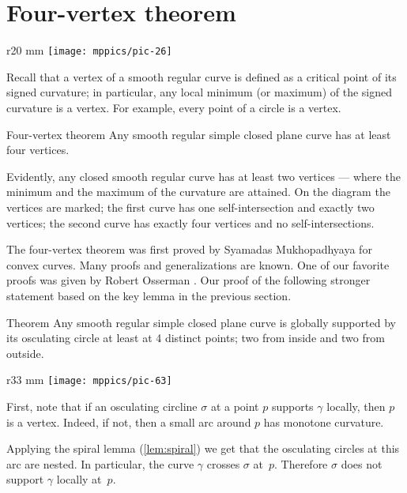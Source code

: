 \section{Four-vertex theorem}
{

\begin{wrapfigure}{r}{20 mm}
\vskip-8mm
\centering
\texttt{[image: mppics/pic-26]}
\vskip0mm
\end{wrapfigure}

Recall that a vertex of a smooth regular curve is defined as a critical point of its signed curvature;
in particular, any local minimum (or maximum) of the signed curvature is a vertex.
For example, every point of a circle is a vertex.

\begin{thm}{Four-vertex theorem}\label{thm:4-vert}
Any smooth regular simple closed plane curve has at least four vertices.
\end{thm}

}

Evidently, any closed smooth regular curve has at least two vertices --- where the minimum and the maximum of the curvature are attained.
On the diagram the vertices are marked;
the first curve has one self-intersection and exactly two vertices;
the second curve has exactly four vertices and no self-intersections.

The four-vertex theorem was first proved by Syamadas Mukhopadhyaya \cite{mukhopadhyaya} for convex curves.
Many proofs and generalizations are known.
One of our favorite proofs was given by Robert Osserman \cite{osserman}.
Our proof of the following stronger statement based on the key lemma in the previous section.


\begin{thm}{Theorem}\label{thm:4-vert-supporting}
Any smooth regular simple closed plane curve is globally supported by its osculating circle at least at 4 distinct points;
two from inside and two from outside.
\end{thm}

{

\begin{wrapfigure}[8]{r}{33 mm}
\vskip-0mm
\centering
\texttt{[image: mppics/pic-63]}
\vskip0mm
\end{wrapfigure}

First, note that if an osculating circline $\sigma$ at a point $p$ supports $\gamma$ locally, then $p$ is a vertex.
Indeed, if not, then a small arc around $p$ has monotone curvature.


Applying the spiral lemma (\ref{lem:spiral}) we get that the osculating circles at this arc are nested.
In particular, the curve $\gamma$ crosses $\sigma$ at~$p$. 
Therefore $\sigma$ does not support $\gamma$ locally at~$p$.
\qeds


}


